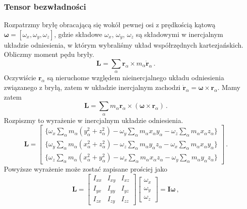 \documentclass[../main.tex]{subfiles}
\begin{document}
\subsubsection{Tensor bezwładności}
Rozpatrzmy bryłę obracającą się wokół pewnej osi z prędkością kątową \(\boldsymbol{\omega}=[\omega_x,\omega_y,\omega_z]\), gdzie składowe \(\omega_x\), \(\omega_y\), \(\omega_z\) są składowymi w inercjalnym układzie odniesienia, w którym wybraliśmy układ współrzędnych kartezjańskich. Obliczmy moment pędu bryły.
\begin{equation*}
    \mathbf{L}=\sum_\alpha\mathbf{r}_\alpha\times m_\alpha\dot{\mathbf{r}}_\alpha\,.
\end{equation*}
Oczywiście \(\mathbf{r}_\alpha\) są nieruchome względem nieinercjalnego układu odniesienia związanego z bryłą, zatem w układzie inercjalnym zachodzi \(\dot{\mathbf{r}}_\alpha=\boldsymbol{\omega}\times\mathbf{r}_\alpha\). Mamy zatem
\begin{equation*}
    \mathbf{L}=\sum_\alpha m_\alpha\mathbf{r}_\alpha\times (\boldsymbol{\omega}\times\boldsymbol{r}_\alpha)\,.
\end{equation*}
Rozpiszmy to wyrażenie w inercjalnym układzie odniesienia.
\begin{equation*}
    \mathbf{L}=\begin{bmatrix} \{\omega_x\sum_\alpha m_\alpha (y_\alpha^2+z_\alpha^2)-\omega_y\sum_\alpha m_\alpha x_\alpha y_\alpha- \omega_z\sum_\alpha m_\alpha x_\alpha z_\alpha\}\\
    \{\omega_y\sum_\alpha m_\alpha (x_\alpha^2+z_\alpha^2)-\omega_z\sum_\alpha m_\alpha y_\alpha z_\alpha- \omega_x\sum_\alpha m_\alpha x_\alpha y_\alpha\}\\
    \{\omega_z\sum_\alpha m_\alpha (x_\alpha^2+y_\alpha^2)-\omega_x\sum_\alpha m_\alpha x_\alpha z_\alpha- \omega_y\sum_\alpha m_\alpha y_\alpha z_\alpha\}
    \end{bmatrix}\,.
\end{equation*}
Powyższe wyrażenie może zostać zapisane prościej jako
\begin{equation*}
    \mathbf{L}=\begin{bmatrix} I_{xx}&I_{xy}&I_{xz}\\I_{yx}&I_{yy}&I_{yz}\\I_{zx}&I_{zy}&I_{zz}\end{bmatrix}\begin{bmatrix}\omega_x\\\omega_y\\\omega_z\end{bmatrix}=\mathbf{I}\boldsymbol{\omega}\,,
\end{equation*}
\end{document}
